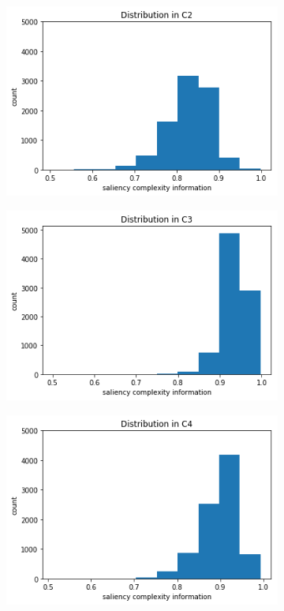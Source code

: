 \documentclass[conference]{IEEEtran}
\begin{document}
    
        \begin{figure}[h!]
  	\centering
   	\begin{subfigure}[b]{0.4\linewidth}
    	\includegraphics[width=\linewidth]{C2.png}
   	\end{subfigure}
  	\begin{subfigure}[b]{0.4\linewidth}
    	\includegraphics[width=\linewidth]{C3.png}
  	\end{subfigure}
  	   	\begin{subfigure}[b]{0.4\linewidth}
    	\includegraphics[width=\linewidth]{C4.png}

\end{subfigure}
\end{figure}
\end{document}
